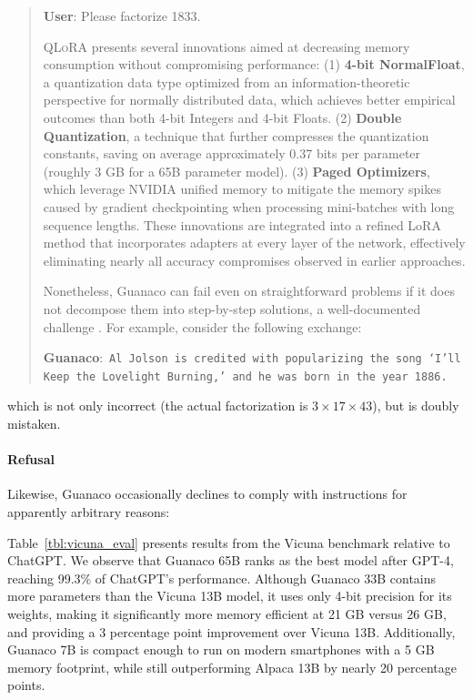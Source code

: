 \begin{quote}
    \textbf{User}: Please factorize 1833.

\textsc{QLoRA} presents several innovations aimed at decreasing memory consumption without compromising performance: (1) \textbf{4-bit NormalFloat}, a quantization data type optimized from an information-theoretic perspective for normally distributed data, which achieves better empirical outcomes than both 4-bit Integers and 4-bit Floats. (2) \textbf{Double Quantization}, a technique that further compresses the quantization constants, saving on average approximately 0.37 bits per parameter (roughly 3 GB for a 65B parameter model). (3) \textbf{Paged Optimizers}, which leverage NVIDIA unified memory to mitigate the memory spikes caused by gradient checkpointing when processing mini-batches with long sequence lengths. These innovations are integrated into a refined LoRA method that incorporates adapters at every layer of the network, effectively eliminating nearly all accuracy compromises observed in earlier approaches.

Nonetheless, {Guanaco} can fail even on straightforward problems if it does not decompose them into step-by-step solutions, a well-documented challenge \cite{weichain}. For example, consider the following exchange:

     \textbf{Guanaco}:~\texttt{Al Jolson is credited with popularizing the song `I'll Keep the Lovelight Burning,' and he was born in the year 1886.}
 \end{quote}

which is not only incorrect (the actual factorization is $3 \times 17 \times 43$), but is doubly mistaken.

\paragraph{Refusal} Likewise, {Guanaco} occasionally declines to comply with instructions for apparently arbitrary reasons:

Table~\ref{tbl:vicuna_eval} presents results from the Vicuna benchmark \cite{vicuna2023} relative to ChatGPT. We observe that {Guanaco} 65B ranks as the best model after GPT-4, reaching 99.3\% of ChatGPT’s performance. Although {Guanaco} 33B contains more parameters than the Vicuna 13B model, it uses only 4-bit precision for its weights, making it significantly more memory efficient at 21 GB versus 26 GB, and providing a 3 percentage point improvement over Vicuna 13B. Additionally, {Guanaco} 7B is compact enough to run on modern smartphones with a 5 GB memory footprint, while still outperforming Alpaca 13B by nearly 20 percentage points.

